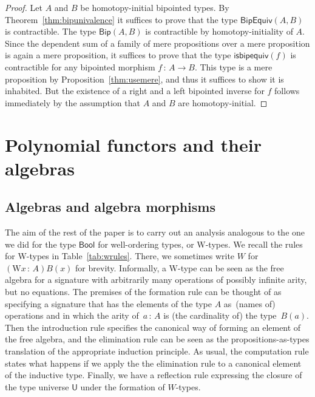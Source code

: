 \documentclass[10pt,a4paper,oneside,reqno]{amsart}
\numberwithin{equation}{section}
\theoremstyle{mythm}
\theoremstyle{mydef}
\theoremstyle{myrmk}
\newcommand{\co}{\,{:}\,}
\newcommand{\Bool}{\mathsf{Bool}}
\newcommand{\W}{\mathrm{W}}
\newcommand{\U}{\mathsf{U}}
\newcommand{\BipHom}{\mathsf{Bip}}
\newcommand{\isbipequiv}{\mathsf{isbipequiv}}
\newcommand{\BipEquiv}{\mathsf{BipEquiv}}
\begin{document}
\begin{proof} Let $A$ and $B$ be homotopy-initial bipointed types. 
By Theorem~\ref{thm:bipunivalence} it suffices to prove that the type $\BipEquiv(A,B)$ is contractible. The type 
$\BipHom( A, B)$ is contractible by homotopy-initiality of $A$. Since the dependent sum of a family of mere propositions over a mere proposition is again a mere proposition, it suffices to prove that the type $\isbipequiv(f)$ is contractible for any bipointed morphism $f \co A \to B$. This type is a mere proposition by 
Proposition~\ref{thm:usemere}, and thus it suffices to show it is inhabited. But the existence of a right and a left bipointed inverse for $f$ follows immediately
by the assumption that $A$ and $B$ are homotopy-initial.
\end{proof}



% 

\section{Polynomial functors and their algebras}
\label{section:wfiles}

\subsection*{Algebras and algebra morphisms}
The aim of the rest of the paper is to carry out an analysis
analogous to the one we did for the type $\Bool$  for well-ordering types, or W-types. 
We recall
the rules for W-types in Table~\ref{tab:wrules}. There, we sometimes write $W$ for~$(\W x \co A) B(x)$ for
brevity.  Informally, 
a W-type can be seen as the free algebra for a signature
with arbitrarily many operations of possibly infinite arity, but no equations. The premises of the formation rule can be thought of as specifying a signature that has the elements of the type $A$ as~(names of) operations and in which the arity of~$a \co A$ is (the cardinality of) the type~$B(a)$. Then the introduction rule specifies the canonical way of forming an element of the free algebra, and the elimination rule can be seen as the propositions-as-types translation of the appropriate induction principle. As usual, the computation rule states what happens if we apply the
the elimination rule to a canonical element of the inductive type. Finally, we have a reflection rule expressing the
closure of the type universe $\U$ under the formation of $W$-types.
\end{document}
